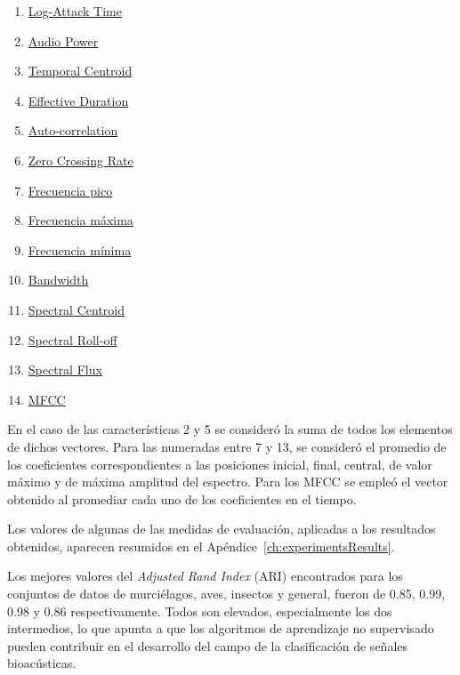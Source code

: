 \begin{multicols}{2}
    \begin{enumerate}
        \item \hyperref[subsec:log-attackTime]{Log-Attack Time}
        \item \hyperref[subsec:audioPower]{Audio Power}
        \item \hyperref[subsec:temporalCentroid]{Temporal Centroid}
        \item \hyperref[subsec:effectiveDuration]{Effective Duration}
        \item \hyperref[subsec:auto-correlation]{Auto-correlation}
        \item \hyperref[subsec:zeroCrossingRate]{Zero Crossing Rate}
        \item \hyperref[itemize:basic-spectral-features]{Frecuencia pico}
        \item \hyperref[itemize:basic-spectral-features]{Frecuencia máxima}
        \item \hyperref[itemize:basic-spectral-features]{Frecuencia mínima}
        \item \hyperref[itemize:basic-spectral-features]{Bandwidth}
        \item \hyperref[subsubsec:spectralCentroid]{Spectral Centroid}
        \item \hyperref[subsubsec:spectrallRollOff]{Spectral Roll-off}
        \item \hyperref[subsec:spectralFlux]{Spectral Flux}
        \item \hyperref[sec:MFCC]{MFCC}
    \end{enumerate}
\end{multicols}

En el caso de las características 2 y 5 se consideró la suma de todos los elementos de dichos vectores.
Para las numeradas entre 7 y 13, se consideró el promedio de los coeficientes correspondientes a las posiciones inicial, final, central, de valor máximo y de máxima amplitud del espectro.
Para los MFCC se empleó el vector obtenido al promediar cada uno de los coeficientes en el tiempo.

Los valores de algunas de las medidas de evaluación, aplicadas a los resultados obtenidos, aparecen resumidos en el Apéndice~\ref{ch:experimentsResults}.

Los mejores valores del \textit{Adjusted Rand Index} (ARI) encontrados para los conjuntos de datos de murciélagos, aves, insectos y general, fueron de 0.85, 0.99, 0.98 y 0.86 respectivamente.
Todos son elevados, especialmente los dos intermedios, lo que apunta a que los algoritmos de aprendizaje no supervisado pueden contribuir en el desarrollo del campo de la clasificación de señales bioacústicas.

